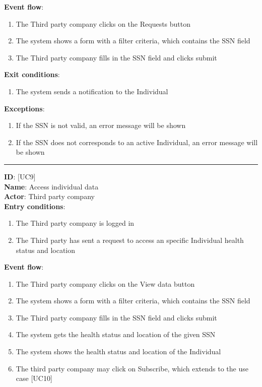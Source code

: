 \documentclass[12pt]{article}
\newcommand\usecase[1]{ [UC#1] }
\begin{document}
\begin{itemize}
\begin{enumerate}
  		\end{enumerate}
  	\textbf{Event flow}:
  		\begin{enumerate}
    			\item{The Third party company clicks on the Requests button}
    			\item{The system shows a form with a filter criteria, which contains the SSN field}
    			\item{The Third party company fills in the SSN field and clicks submit}
  		\end{enumerate}
  	\textbf{Exit conditions}:
  		\begin{enumerate}
    			\item{The system sends a notification to the Individual}
  		\end{enumerate}
  	\textbf{Exceptions}: 
  		\begin{enumerate}
    			\item{If the SSN is not valid, an error message will be shown}
    			\item{If the SSN does not corresponds to an active Individual, an error message will be shown}
  		\end{enumerate}
  	\rule{\linewidth}{0.4pt}
  	\textbf{ID}: \usecase{9} \\
  	\textbf{Name}: Access individual data \\
    \textbf{Actor}: Third party company \\
    \textbf{Entry conditions}:
    		\begin{enumerate}
    			\item{The Third party company is logged in}
    			\item{The Third party has sent a request to access an specific Individual health status and location}
  		\end{enumerate}
  	\textbf{Event flow}:
  		\begin{enumerate}
    			\item{The Third party company clicks on the View data button}
    			\item{The system shows a form with a filter criteria, which contains the SSN field}
    			\item{The Third party company fills in the SSN field and clicks submit}
    			\item{The system gets the health status and location of the given SSN}
    			\item{The system shows the health status and location of the Individual}
    			\item{The third party company may click on Subscribe, which extends to the use case \usecase{10}}

\end{enumerate}
\end{itemize}
\end{document}
